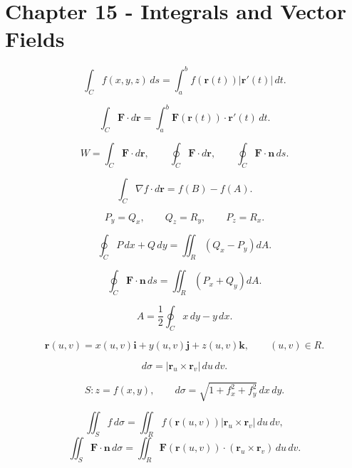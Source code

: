 
\section*{Chapter 15 - Integrals and Vector Fields}

\[
  \int_C f(x,y,z)\,ds
  =
  \int_a^b f(\mathbf r(t))|\mathbf r'(t)|\,dt.
\]

\[
  \int_C \mathbf F\cdot d\mathbf r
  =
  \int_a^b \mathbf F(\mathbf r(t))\cdot\mathbf r'(t)\,dt.
\]

\[
  W=\int_C \mathbf F\cdot d\mathbf r,
  \qquad
  \oint_C \mathbf F\cdot d\mathbf r,
  \qquad
  \oint_C \mathbf F\cdot\mathbf n\,ds.
\]

\[
  \int_C \nabla f\cdot d\mathbf r=f(B)-f(A).
\]

\[
  P_y=Q_x,\qquad Q_z=R_y,\qquad P_z=R_x.
\]

\[
  \oint_C P\,dx+Q\,dy
  =
  \iint_R\left(Q_x-P_y\right)dA.
\]

\[
  \oint_C \mathbf F\cdot\mathbf n\,ds
  =
  \iint_R\left(P_x+Q_y\right)dA.
\]

\[
  A=\frac12\oint_C x\,dy-y\,dx.
\]

\[
  \mathbf r(u,v)
  =
  x(u,v)\mathbf i+y(u,v)\mathbf j+z(u,v)\mathbf k,
  \qquad (u,v)\in R.
\]

\[
  d\sigma=|\mathbf r_u\times\mathbf r_v|\,du\,dv.
\]

\[
  S:z=f(x,y),
  \qquad
  d\sigma=\sqrt{1+f_x^2+f_y^2}\,dx\,dy.
\]

\[
  \iint_S f\,d\sigma
  =
  \iint_R f(\mathbf r(u,v))|\mathbf r_u\times\mathbf r_v|\,du\,dv,
\]
\[
  \iint_S \mathbf F\cdot\mathbf n\,d\sigma
  =
  \iint_R \mathbf F(\mathbf r(u,v))\cdot(\mathbf r_u\times\mathbf r_v)\,du\,dv.
\]

